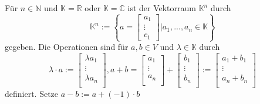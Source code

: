 Für $n \in \mathbb{N}$ und $\mathbb{K} = \mathbb{R}$ oder $\mathbb{K} = \mathbb{C}$ ist der Vektorraum $\mathbb{K}^n$ durch
\begin{displaymath}
    \mathbb{K}^n:=\left\{a = 
    \begin{bmatrix} 
        a_1 \\ 
        \vdots \\ 
        c_1 
    \end{bmatrix}  
    \vert a_1,...,a_n \in \mathbb{K} \right\}
\end{displaymath}
gegeben. Die Operationen sind für $a,b \in V $ und $\lambda \in \mathbb{K}$ durch
\begin{displaymath}
    \lambda \cdot a := 
    \begin{bmatrix}
        \lambda a_1 \\
        \vdots \\
        \lambda a_n \\
    \end{bmatrix}
    , a+b = 
    \begin{bmatrix}
        a_1 \\
        \vdots \\
        a_n \\
    \end{bmatrix}
    +
    \begin{bmatrix}
        b_1 \\
        \vdots \\
        b_n \\
    \end{bmatrix}
    :=
    \begin{bmatrix}
        a_1 + b_1 \\
        \vdots \\
        a_n + b_n \\
    \end{bmatrix}
\end{displaymath}
definiert. Setze $a-b := a+(-1)\cdot b$
